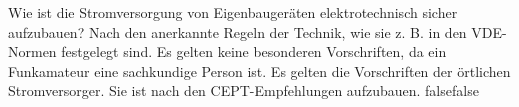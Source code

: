     {Wie ist die Stromversorgung von Eigenbaugeräten elektrotechnisch sicher aufzubauen?}
    {Nach den anerkannte Regeln der Technik, wie sie z. B. in den VDE-Normen festgelegt sind.}
    {Es gelten keine besonderen Vorschriften, da ein Funkamateur eine sachkundige Person ist.}
    {Es gelten die Vorschriften der örtlichen Stromversorger.}
    {Sie ist nach den CEPT-Empfehlungen aufzubauen.}
    {false}{false}